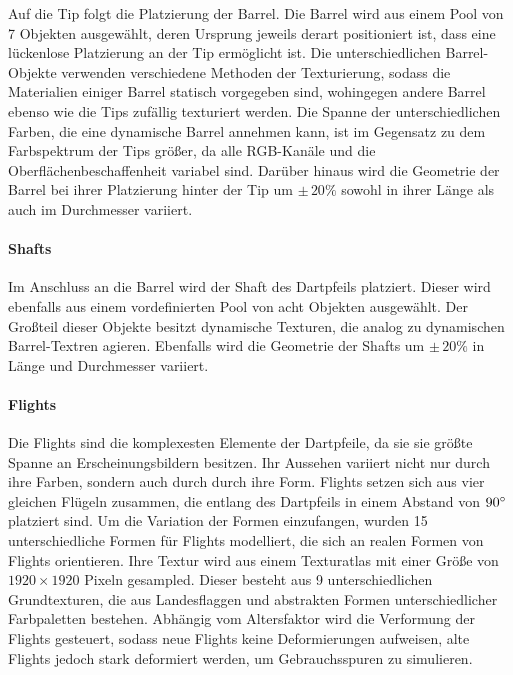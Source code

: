 Auf die Tip folgt die Platzierung der Barrel. Die Barrel wird aus einem Pool von 7 Objekten ausgewählt, deren Ursprung jeweils derart positioniert ist, dass eine lückenlose Platzierung an der Tip ermöglicht ist. Die unterschiedlichen Barrel-Objekte verwenden verschiedene Methoden der Texturierung, sodass die Materialien einiger Barrel statisch vorgegeben sind, wohingegen andere Barrel ebenso wie die Tips zufällig texturiert werden. Die Spanne der unterschiedlichen Farben, die eine dynamische Barrel annehmen kann, ist im Gegensatz zu dem Farbspektrum der Tips größer, da alle RGB-Kanäle und die Oberflächenbeschaffenheit variabel sind. Darüber hinaus wird die Geometrie der Barrel bei ihrer Platzierung hinter der Tip um $\pm\,20\%$ sowohl in ihrer Länge als auch im Durchmesser variiert.

\paragraph{Shafts}

Im Anschluss an die Barrel wird der Shaft des Dartpfeils platziert. Dieser wird ebenfalls aus einem vordefinierten Pool von acht Objekten ausgewählt. Der Großteil dieser Objekte besitzt dynamische Texturen, die analog zu dynamischen Barrel-Textren agieren. Ebenfalls wird die Geometrie der Shafts um $\pm\,20\%$ in Länge und Durchmesser variiert.

\paragraph{Flights}

Die Flights sind die komplexesten Elemente der Dartpfeile, da sie sie größte Spanne an Erscheinungsbildern besitzen. Ihr Aussehen variiert nicht nur durch ihre Farben, sondern auch durch durch ihre Form. Flights setzen sich aus vier gleichen Flügeln zusammen, die entlang des Dartpfeils in einem Abstand von $90^{\circ}$ platziert sind. Um die Variation der Formen einzufangen, wurden 15 unterschiedliche Formen für Flights modelliert, die sich an realen Formen von Flights orientieren. Ihre Textur wird aus einem Texturatlas mit einer Größe von $1920 \times 1920$ Pixeln gesampled. Dieser besteht aus 9 unterschiedlichen Grundtexturen, die aus Landesflaggen und abstrakten Formen unterschiedlicher Farbpaletten bestehen. Abhängig vom Altersfaktor wird die Verformung der Flights gesteuert, sodass neue Flights keine Deformierungen aufweisen, alte Flights jedoch stark deformiert werden, um Gebrauchsspuren zu simulieren.

